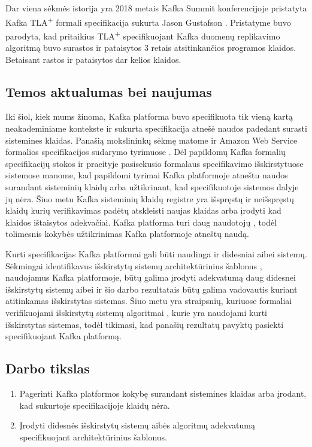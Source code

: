 \documentclass{VUMIFPSmagistrinis}
\begin{document}
		Dar viena sėkmės istorija yra 2018 metais Kafka Summit konferencijoje pristatyta Kafka TLA\textsuperscript{+} formali specifikacija sukurta Jason Gustafson \cite{kfkTla}.
		Pristatyme buvo parodyta, kad pritaikius TLA\textsuperscript{+} specifikuojant Kafka duomenų replikavimo algoritmą buvo surastos ir pataisytos 3 retais atsitinkančios programos klaidos.
		Betaisant rastos ir pataisytos dar kelios klaidos.

	\subsection{Temos aktualumas bei naujumas}
		Iki šiol, kiek mums žinoma, Kafka platforma buvo specifikuota tik vieną kartą \cite{kfkTla} neakademiniame kontekste ir sukurta specifikacija atnešė naudos padedant surasti sistemines klaidas.
		Panašią mokslininkų sėkmę matome ir Amazon Web Service formalios specifikacijos sudarymo tyrimuose \cite{newcombe2014use}.
		Dėl papildomų Kafka formalių specifikacijų stokos ir praeityje pasisekusio formalaus specifikavimo išskirstytuose sistemose manome, kad papildomi tyrimai Kafka platformoje atneštu naudos surandant sisteminių klaidų arba užtikrinant, kad specifikuotoje sistemos dalyje jų nėra.
		Šiuo metu Kafka sisteminių klaidų registre \cite{kfkissue} yra išspręstų ir neišspręstų  klaidų kurių verifikavimas padėtų atskleisti naujas klaidas arba įrodyti kad klaidos ištaisytos adekvačiai.
		Kafka platforma turi daug naudotojų \cite{kfk}, todėl tolimesnis kokybės užtikrinimas Kafka platformoje atneštų naudą.

		
		Kurti specifikacijas Kafka platformai gali būti naudinga ir didesniai aibei sistemų. 
		Sėkmingai identifikavus išskirstytų sistemų architektūrinius šablonus \cite{hohpe2004enterprise}, naudojamus Kafka platformoje, būtų galima įrodyti adekvatumą daug didesnei išskirstytų sistemų aibei ir šio darbo rezultatais būtų galima vadovautis kuriant atitinkamas išskirstytas sistemas. 
		Šiuo metu yra straipsnių, kuriuose formaliai verifikuojami išskirstytų sistemų algoritmai \cite{lamport2005generalized}, kurie yra naudojami kurti išskirstytas sistemas, todėl tikimasi, kad panašių rezultatų pavyktų pasiekti specifikuojant Kafka platformą.
	
	\subsection{Darbo tikslas}
		\begin{enumerate}
			\item{Pagerinti Kafka platformos kokybę surandant sistemines klaidas arba įrodant, kad sukurtoje specifikacijoje klaidų nėra.}
			\item{Įrodyti didesnės išskirstytų sistemų aibės algoritmų adekvatumą specifikuojant architektūrinius šablonus.}
		\end{enumerate}	
\end{document}
